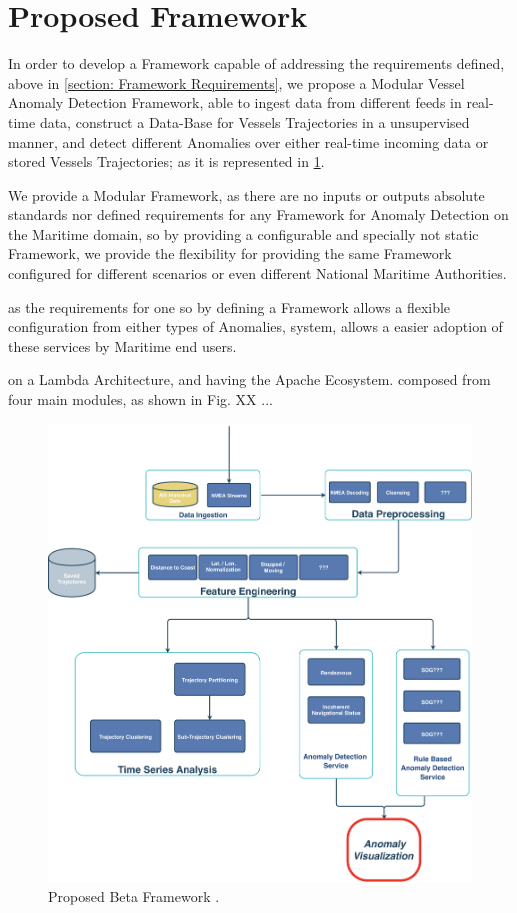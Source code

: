 

\section{Proposed Framework}
In order to develop a Framework capable of addressing the requirements defined, above in \ref{section: Framework Requirements}, we propose a Modular Vessel Anomaly Detection Framework, able to ingest data from different feeds in real-time data, construct a Data-Base for Vessels Trajectories in a unsupervised manner, and detect different Anomalies over either real-time incoming data or stored Vessels Trajectories; as it is represented in \ref{fig:Framework}.

We provide a Modular Framework, as there are no inputs or outputs absolute standards nor defined requirements for any Framework for Anomaly Detection on the Maritime domain, so by providing a configurable and specially not static Framework, we provide the flexibility for providing the same Framework configured for different scenarios or even different National Maritime Authorities.

as the requirements for one so by defining a Framework allows a flexible configuration from either types of Anomalies, system, allows a easier adoption of these services by Maritime end users. 

on a Lambda Architecture, and having the Apache Ecosystem. composed from four main modules, as shown in Fig. XX ...

\begin{figure}[H]
	\centering
	\includegraphics[scale = .37]{figures/Ch3/Framework.pdf}
    \caption{Proposed Beta Framework .}
    \label{fig:Framework}
\end{figure}

